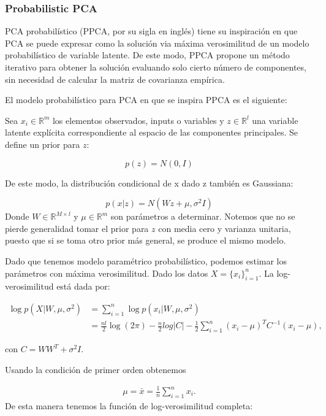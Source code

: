 \subsubsection{Probabilistic PCA}
PCA probabilístico (PPCA, por su sigla en inglés) tiene su inspiración en que PCA se puede expresar como la solución via máxima verosimilitud de un modelo probabilístico de variable latente. De este modo, PPCA propone un método iterativo para obtener la solución evaluando solo cierto número de componentes, sin necesidad de calcular la matriz de covarianza empírica.

El modelo probabilístico para PCA en que se inspira PPCA es el siguiente:

Sea $x_i\in \mathbb{R}^m$ los elementos observados, inputs o variables y $z\in \mathbb{R}^l$ una variable latente explícita correspondiente al espacio de las componentes principales. Se define un prior para $z$:

\begin{equation}
p(z) = N(0,I)
\end{equation}

De este modo, la distribución condicional de x dado z también es Gaussiana:

\begin{equation}
p(x|z) = N(Wz+\mu,\sigma^2I)
\end{equation}
Donde $W\in \mathbb{R}^{M\times l}$ y $\mu \in \mathbb{R}^m$ son parámetros a determinar. Notemos que no se pierde generalidad tomar el prior para $z$ con media cero y varianza unitaria, puesto que si se toma otro prior más general, se produce el mismo modelo.

Dado que tenemos modelo paramétrico probabilístico, podemos estimar los parámetros con máxima verosimilitud. Dado los datos $X = \{x_i\}_{i=1}^n$. La log-verosimilitud está dada por:

\begin{align}
\log p(X|W,\mu, \sigma^2) & = \sum_{i=1}^n \log p(x_i|W,\mu, \sigma^2)\\
& = \frac{n l}{2}\log (2\pi) - \frac{n}{2}log|C| - \frac{1}{2}\sum_{i=1}^n (x_i-\mu)^T C^{-1} (x_i-\mu),
\end{align}

con $C = WW^T + \sigma^2 I$.

Usando la condición de primer orden obtenemos

\begin{align}
\mu = \bar{x} = \frac{1}{n}\sum_{i=1}^n x_i.
\end{align}
De esta manera tenemos la función de log-verosimilitud completa:

